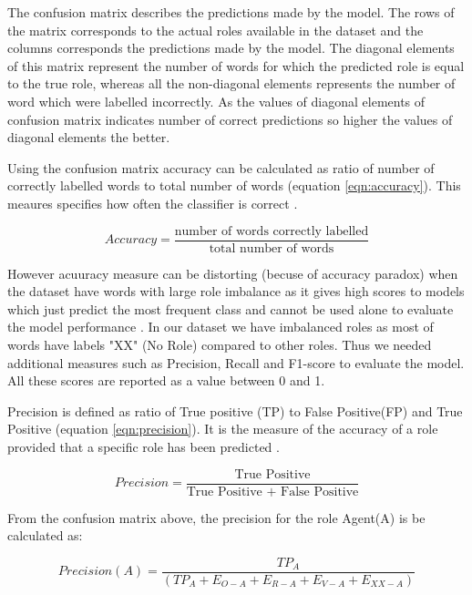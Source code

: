 The confusion matrix describes the predictions made by the model. The rows of the matrix corresponds to the actual roles available in the dataset and the columns corresponds the predictions made by the model. The diagonal elements of this matrix represent the number of words for which the predicted role is equal to the true role,  whereas all the non-diagonal elements represents the number of word which were labelled incorrectly. As the values of diagonal elements of confusion matrix indicates number of correct predictions so higher the values of diagonal elements the better.

Using the confusion matrix accuracy can be calculated as ratio of number of correctly labelled words to total number of words (equation \ref{eqn:accuracy}). This meaures specifies how often the classifier is correct \cite{classification_scores:2009}. 

\begin{equation}\label{eqn:accuracy}
Accuracy = \frac{\text{number of words correctly labelled}}{\text{total number of words}}
\end{equation}
 
However acuuracy measure can be distorting (becuse of accuracy paradox) when the dataset have words with large role imbalance as it gives high scores to models which just predict the most frequent class and cannot be used alone to evaluate the model performance \cite{accuracy_paradox_1:2008, accuracy_paradox_2:2014}. In our dataset we have imbalanced roles as most of words have labels "XX" (No Role) compared to other roles. Thus we needed additional measures such as Precision, Recall and F1-score to evaluate the model. All these scores are reported as a value between 0 and 1. 

Precision is defined as ratio of True positive (TP) to False Positive(FP) and True Positive (equation \ref{eqn:precision}). It is the measure of the accuracy of a role provided that a specific role has been predicted \cite{classification_scores:2009}.

\begin{equation}\label{eqn:precision}
Precision = \frac{\text{True Positive}}{\text{True Positive + False Positive}}
\end{equation}

From the confusion matrix above, the precision for the role Agent(A) is be calculated as:

\[Precision(A) = \frac{TP_{A}}{(TP_{A}+E_{O-A}+E_{R-A}+E_{V-A}+E_{XX-A})}\]


